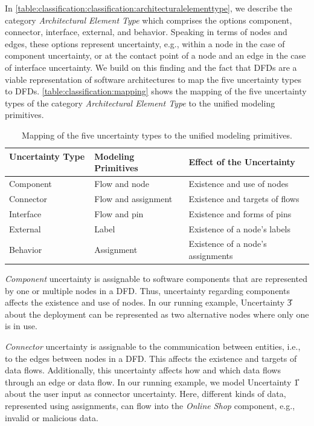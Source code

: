 In \autoref{table:classification:classification:architecturalelementtype}, we describe the category \emph{Architectural Element Type} which comprises the options component, connector, interface, external, and behavior.
Speaking in terms of nodes and edges, these options represent uncertainty, e.g., within a node in the case of component uncertainty, or at the contact point of a node and an edge in the case of interface uncertainty.
We build on this finding and the fact that \acp{DFD} are a viable representation of software architectures \cite{schneider_how_2024} to map the five uncertainty types to \acp{DFD}. 
\autoref{table:classification:mapping} shows the mapping of the five uncertainty types of the category \emph{Architectural Element Type} to the unified modeling primitives.


\begin{table}
    \centering
    \begin{tabular}{lll}
        \toprule
        Uncertainty Type \, & Modeling Primitives \, & Effect of the Uncertainty \\
        \midrule
        Component & Flow and node                           & Existence and use of nodes \\
        Connector & Flow and assignment                     & Existence and targets of flows \\
        Interface & Flow and pin                            & Existence and forms of pins \\
        External  & Label                                   & Existence of a node's labels \\
        Behavior  & Assignment                              & Existence of a node's assignments \\
        \bottomrule
    \end{tabular}
    \caption{Mapping of the five uncertainty types to the unified modeling primitives.}%
    \label{table:classification:mapping}
\end{table}

\emph{Component} uncertainty is assignable to software components that are represented by one or multiple nodes in a \ac{DFD}.
Thus, uncertainty regarding components affects the existence and use of nodes.
In our running example, Uncertainty \U{3} about the deployment can be represented as two alternative nodes where only one is in use.

\emph{Connector} uncertainty is assignable to the communication between entities, i.e., to the edges between nodes in a \ac{DFD}.
This affects the existence and targets of data flows.
Additionally, this uncertainty affects how and which data flows through an edge or data flow.
In our running example, we model Uncertainty \U{1} about the user input as connector uncertainty.
Here, different kinds of data, represented using assignments, can flow into the \emph{Online Shop} component, e.g., invalid or malicious data.

